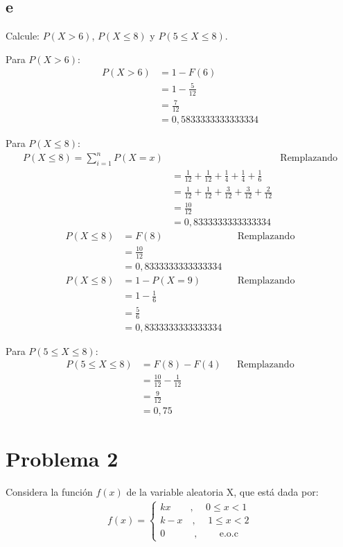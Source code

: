 \documentclass{templateNote}
\begin{document}
\subsection{e}
Calcule: $P(X > 6)$, $P(X \leq 8)$ y $P(5 \leq X \leq 8)$.

Para $P(X > 6)$:
\begin{align*}
    P(X > 6) &= 1 - F(6) \\
    &= 1 - \frac{5}{12} \\
    &= \frac{7}{12} \\
    &= 0,5833333333333334
\end{align*}

Para $P(X \leq 8)$:
\begin{align*}
    P(X \leq 8) = \displaystyle \sum_{i=1}^{n}{P(X=x)} && \text{Remplazando} \\
    &= \frac{1}{12} + \frac{1}{12} + \frac{1}{4} + \frac{1}{4} + \frac{1}{6} \\
    &= \frac{1}{12} + \frac{1}{12} + \frac{3}{12} + \frac{3}{12} + \frac{2}{12} \\
    &= \frac{10}{12} \\
    &= 0,8333333333333334
\end{align*}
\begin{align*}
    P(X \leq 8) &= F(8) && \text{Remplazando} \\
    &= \frac{10}{12} \\
    &= 0,8333333333333334
\end{align*}
\begin{align*}
    P(X \leq 8) &= 1 - P(X = 9) && \text{Remplazando} \\
    &= 1 - \frac{1}{6} \\
    &= \frac{5}{6} \\
    &= 0,8333333333333334
\end{align*}

Para $P(5 \leq X \leq 8)$:
\begin{align*}
    P(5 \leq X \leq 8) &= F(8) - F(4) && \text{Remplazando} \\
    &= \frac{10}{12} - \frac{1}{12} \\
    &= \frac{9}{12} \\
    &= 0,75
\end{align*}

\newpage
\section{Problema 2}
\indent
Considera la función $f(x)$ de la variable aleatoria X, que está dada por:
\begin{align*}
    f(x) = \begin{cases}
        kx \quad \quad \text{, } \quad 0 \leq x < 1 \\
        k - x \quad \text{, }\quad 1 \leq x < 2 \\
        0 \quad \quad \quad \text{, } \quad \quad \text{e.o.c}
    \end{cases}
\end{align*}
\end{document}
